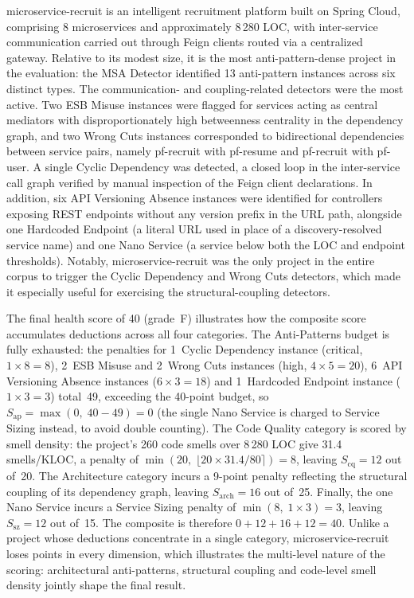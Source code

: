 \par microservice-recruit is an intelligent recruitment platform built on Spring Cloud, comprising 8 microservices and approximately 8\,280 LOC, with inter-service communication carried out through Feign clients routed via a centralized gateway. Relative to its modest size, it is the most anti-pattern-dense project in the evaluation: the MSA Detector identified 13 anti-pattern instances across six distinct types. The communication- and coupling-related detectors were the most active. Two ESB Misuse instances were flagged for services acting as central mediators with disproportionately high betweenness centrality in the dependency graph, and two Wrong Cuts instances corresponded to bidirectional dependencies between service pairs, namely pf-recruit with pf-resume and pf-recruit with pf-user. A single Cyclic Dependency was detected, a closed loop in the inter-service call graph verified by manual inspection of the Feign client declarations. In addition, six API Versioning Absence instances were identified for controllers exposing REST endpoints without any version prefix in the URL path, alongside one Hardcoded Endpoint (a literal URL used in place of a discovery-resolved service name) and one Nano Service (a service below both the LOC and endpoint thresholds). Notably, microservice-recruit was the only project in the entire corpus to trigger the Cyclic Dependency and Wrong Cuts detectors, which made it especially useful for exercising the structural-coupling detectors.

\par The final health score of 40 (grade~F) illustrates how the composite score accumulates deductions across all four categories. The Anti-Patterns budget is fully exhausted: the penalties for 1~Cyclic Dependency instance (critical, $1 \times 8 = 8$), 2~ESB Misuse and 2~Wrong Cuts instances (high, $4 \times 5 = 20$), 6~API Versioning Absence instances ($6 \times 3 = 18$) and 1~Hardcoded Endpoint instance ($1 \times 3 = 3$) total~49, exceeding the 40-point budget, so $S_{\mathrm{ap}} = \max(0,\; 40 - 49) = 0$ (the single Nano Service is charged to Service Sizing instead, to avoid double counting). The Code Quality category is scored by smell density: the project's 260 code smells over 8\,280 LOC give 31.4 smells/KLOC, a penalty of $\min(20,\; \lfloor 20 \times 31.4 / 80 \rceil) = 8$, leaving $S_{\mathrm{cq}} = 12$ out of~20. The Architecture category incurs a 9-point penalty reflecting the structural coupling of its dependency graph, leaving $S_{\mathrm{arch}} = 16$ out of~25. Finally, the one Nano Service incurs a Service Sizing penalty of $\min(8,\; 1 \times 3) = 3$, leaving $S_{\mathrm{sz}} = 12$ out of~15. The composite is therefore $0 + 12 + 16 + 12 = 40$. Unlike a project whose deductions concentrate in a single category, microservice-recruit loses points in every dimension, which illustrates the multi-level nature of the scoring: architectural anti-patterns, structural coupling and code-level smell density jointly shape the final result.

